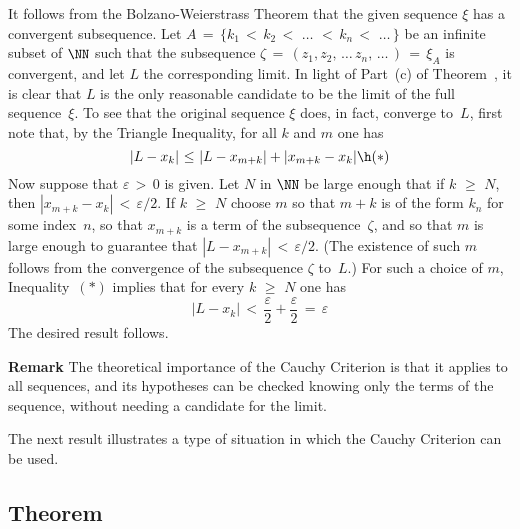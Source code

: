         It follows from the Bolzano-Weierstrass Theorem that the given sequence ${\xi}$ has a convergent subsequence.
    Let $A \,=\, \{k_{1}\,<\,k_{2}\,<\,\,{\ldots}\,\,<\,k_{n}\,<\,\,{\ldots}\,\}$
    be an infinite subset of ${\NN}$ such that the subsequence ${\zeta} \,=\,(z_{1},z_{2},\,{\ldots}\,z_{n},\,{\ldots}\,) \,=\, {\xi}_{A}$
    is convergent, and let $L$ the corresponding limit. In light of Part~(c) of Theorem~,
    it is clear that $L$ is the only reasonable candidate to be the limit of the full sequence~${\xi}$.
    To see that the original sequence ${\xi}$ does, in fact, converge to~$L$, first note that, by the Triangle Inequality, for all $k$ and $m$ one has
        \begin{displaymath}
        |L-x_{k}|\,\,{\leq}\,\,|L-x_{m+k}| + |x_{m+k} - x_{k}| \h ({\ast})
        \end{displaymath}
    Now suppose that ${\varepsilon}\,>\,0$ is given. Let $N$ in ${\NN}$ be large enough that if $k\,\,{\geq}\,\,N$, then $|x_{m+k} - x_{k}|\,<\,{\varepsilon}/2$.
    If $k\,\,{\geq}\,\,N$ choose $m$ so that $m+k$ is of the form $k_{n}$ for some index~$n$,
    so that $x_{m+k}$ is a term of the subsequence~${\zeta}$, and so that $m$ is large enough to guarantee that $|L-x_{m+k}|\,<\,{\varepsilon}/2$.
    (The existence of such $m$ follows from the convergence of the subsequence ${\zeta}$ to~$L$.)
    For such a choice of $m$, Inequality~$({\ast})$ implies that for every $k\,\,{\geq}\,\,N$ one has
        \begin{displaymath}
        |L-x_{k}|\,<\,\frac{{\varepsilon}}{2} + \frac{{\varepsilon}}{2} \,=\, {\varepsilon}
        \end{displaymath}
    The desired result follows.


\V

        {\bf Remark} The theoretical importance of the Cauchy Criterion is that it applies to all sequences,
    and its hypotheses can be checked knowing only the terms of the sequence, without needing a candidate for the limit.

\VV


        The next result illustrates a type of situation in which the Cauchy Criterion can be used.


\V

            \subsection{\small{\bf Theorem}}
            \label{ThmC70.50}

